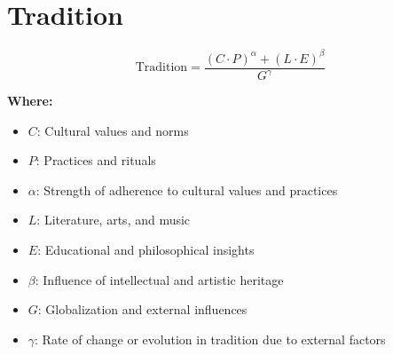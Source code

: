 \chapter{Tradition}

\begin{equation}
\text{Tradition} = \frac{(C \cdot P)^\alpha + (L \cdot E)^\beta}{G^\gamma}
\end{equation}

\textbf{Where:}

\begin{itemize}
    \item $C$: Cultural values and norms
    \item $P$: Practices and rituals
    \item $\alpha$: Strength of adherence to cultural values and practices
    \item $L$: Literature, arts, and music
    \item $E$: Educational and philosophical insights
    \item $\beta$: Influence of intellectual and artistic heritage
    \item $G$: Globalization and external influences
    \item $\gamma$: Rate of change or evolution in tradition due to external factors
\end{itemize}